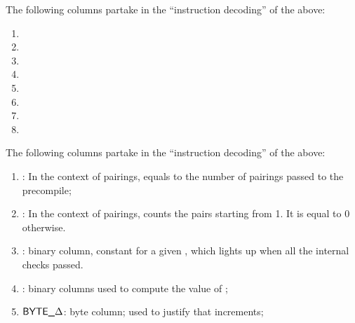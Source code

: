 The following columns partake in the ``instruction decoding'' of the above:
\begin{multicols}{2}
      \begin{enumerate}[resume]
            \item \isEcrecoverData
            \item \isEcrecoverResult
            \item \isEcaddData
            \item \isEcaddResult
            \item \isEcmulData
            \item \isEcmulResult
            \item \isEcpairingData
                  \setcounter{enumTemp}{\theenumi}\item \isEcpairingResult
      \end{enumerate}
\end{multicols}
The following columns partake in the ``instruction decoding'' of the above:
\begin{enumerate}[resume] \setcounter{enumi}{1+\theenumTemp}
      \item \totalPairings:
            In the context of pairings, equals to the number of pairings passed to the precompile;
      \item \accPairings: In the context of pairings, counts the pairs starting from 1. It is equal to 0 otherwise.
      \item \both{\internalChecksPassed}:
            binary column, constant for a given \ecdataId, which lights up when all the internal checks passed.
      \item \hurdle:
            binary columns used to compute the value of \internalChecksPassed;
      \item $\textsf{BYTE}\textsf{\_$\Delta$}$:
            byte column; used to justify that \ecdataId{} increments;
\end{enumerate}


